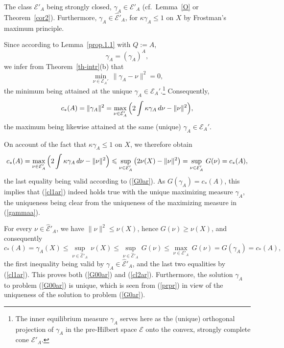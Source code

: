 \documentclass[12pt,a4paper,reqno]{amsart} %
\theoremstyle{lause}
\theoremstyle{maaritelma}
\theoremstyle{lause}
\theoremstyle{maaritelma}
\numberwithin{equation}{section}
\begin{document}
The class $\mathcal E'_A$ being strongly closed, $\gamma_A\in\mathcal E'_A$ (cf.\ Lemma~\ref{O} or Theorem~\ref{cor2}). Furthermore, $\gamma_A\in\widehat{\mathcal E}'_A$, for $\kappa\gamma_A\leqslant1$ on $X$ by Frostman's maximum principle.

Since according to Lemma~\ref{prop.1.1} with $Q:=A$,
\begin{equation}\label{AA}\gamma_A=(\gamma_A)^A,\end{equation}
we infer from Theorem~\ref{th-intr}(b) that
\begin{equation*}\label{gammaa'}\min_{\nu\in\mathcal E_A'}\,\|\gamma_A-\nu\|^2=0,\end{equation*}
the minimum being attained at the unique $\gamma_A\in\mathcal E_A'$.\footnote{The inner equilibrium measure $\gamma_A$ serves here as the (unique) orthogonal projection of $\gamma_A$ in the pre-Hil\-bert space $\mathcal E$ onto the convex, strongly complete cone $\mathcal E'_A$.}
Consequently,
\begin{equation}\label{gammaa}c_*(A)=\|\gamma_A\|^2=
\max_{\nu\in\mathcal E_A'}\,\Bigl(2\int\kappa\gamma_A\,d\nu-\|\nu\|^2\Bigr),\end{equation}
the maximum being likewise attained at the same (unique) $\gamma_A\in\mathcal E_A'$.

On account of the fact that $\kappa\gamma_A\leqslant1$ on $X$, we therefore obtain
\[c_*(A)=\max_{\nu\in\mathcal E_A'}\,\Bigl(2\int\kappa\gamma_A\,d\nu-\|\nu\|^2\Bigr)\leqslant\sup_{\nu\in\mathcal E'_A}\,\bigl(2\nu(X)-\|\nu\|^2\bigr)=\sup_{\nu\in\mathcal E'_A}\,G(\nu)=c_*(A),\]
the last equality being valid according to (\ref{G0ar}). As $G(\gamma_A)=c_*(A)$, this implies that (\ref{cl1ar}) indeed holds true with the unique maximizing measure $\gamma_A$, the uniqueness being clear from the uniqueness of the maximizing measure in (\ref{gammaa}).

For every $\nu\in\widehat{\mathcal E}'_A$, we have $\|\nu\|^2\leqslant\nu(X)$, hence $G(\nu)\geqslant\nu(X)$, and consequently
\begin{equation}\label{prpr}c_*(A)=\gamma_A(X)\leqslant\sup_{\nu\in\widehat{\mathcal E}'_A}\,\nu(X)\leqslant\sup_{\nu\in\widehat{\mathcal E}'_A}\,G(\nu)\leqslant\max_{\nu\in\mathcal E'_A}\,G(\nu)=G(\gamma_A)=c_*(A),\end{equation}
the first inequality being valid by $\gamma_A\in\widehat{\mathcal E}'_A$, and the last two equalities by (\ref{cl1ar}). This proves both (\ref{G00ar}) and (\ref{cl2ar}). Furthermore, the solution $\gamma_A$ to problem (\ref{G00ar}) is unique, which is seen from (\ref{prpr}) in view of the uniqueness of the solution to problem (\ref{G0ar}).
\end{document}
